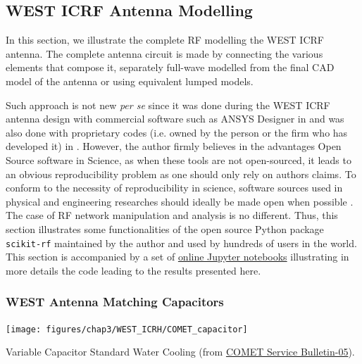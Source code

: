 {%

\subsection{WEST ICRF Antenna Modelling}\label{sec:WEST_ICRH_antenna_modelling}
In this section, we illustrate the complete RF modelling the WEST ICRF antenna. The complete antenna circuit is made by connecting the various elements that compose it, separately full-wave modelled from the final CAD model of the antenna or using equivalent lumped models. 

Such approach is not new \textit{per se} since it was done during the WEST ICRF antenna design with commercial software such as ANSYS Designer in  and was also done with proprietary codes (i.e. owned by the person or the firm who has developed it) in . However, the author firmly believes in the advantages Open Source software in Science, as when these tools are not open-sourced, it leads to an obvious reproducibility problem as one should only rely on authors claims. To conform to the necessity of reproducibility in science,  software sources used in physical and engineering researches should ideally be made open when possible . The case of RF network manipulation and analysis is no different. Thus, this section illustrates some functionalities of the open source Python package \texttt{scikit-rf} maintained by the author and used by hundreds of users in the world. This section is accompanied by a set of  \href{https://doi.org/10.5281/zenodo.2668370}{online Jupyter notebooks} illustrating in more details the code leading to the results presented here.



\subsubsection{WEST Antenna Matching Capacitors}
\begin{marginfigure}
	\centering
	\texttt{[image: figures/chap3/WEST\_ICRH/COMET\_capacitor]}
	\caption{Variable Capacitor Standard Water Cooling (from \href{https://www.comet-pct.com/getmedia/525c5fbc-2356-4c2e-8e62-3f8a3c3da16c/SB-05_Variable_Capacitor_Water_Cooling.aspx}{COMET Service Bulletin-05}).	
}
	\label{fig:cometcapacitor}
\end{marginfigure}

}
